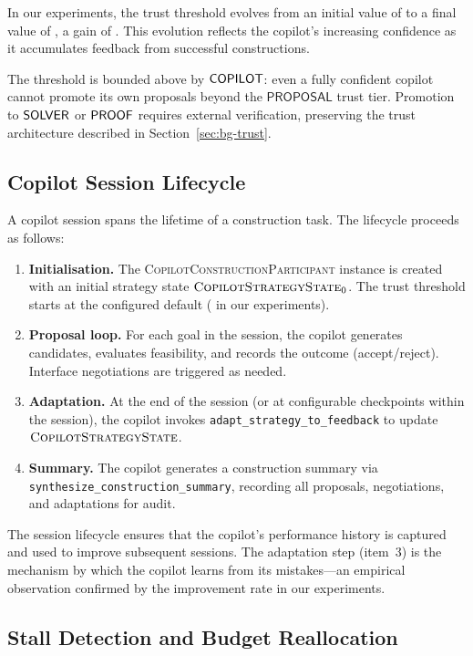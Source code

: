 \documentclass[11pt]{article}
\newcommand{\CCP}{\textsc{CopilotConstructionParticipant}}
\newcommand{\CSS}{\textsc{CopilotStrategyState}}
\begin{document}
In our experiments, the trust threshold evolves from an initial
value of \ppLXXXVIinitTrust{} to a final value of
\ppLXXXVIfinalTrust{}, a gain of \ppLXXXVItrustGain{}.  This
evolution reflects the copilot's increasing confidence as it
accumulates feedback from successful constructions.

The threshold is bounded above by $\mathsf{COPILOT}$: even a fully
confident copilot cannot promote its own proposals beyond the
$\mathsf{PROPOSAL}$ trust tier.  Promotion to $\mathsf{SOLVER}$ or
$\mathsf{PROOF}$ requires external verification, preserving the trust
architecture described in Section~\ref{sec:bg-trust}.

\subsection{Copilot Session Lifecycle}\label{sec:neg-lifecycle}

A copilot session spans the lifetime of a construction task.  The
lifecycle proceeds as follows:
\begin{enumerate}
  \item \textbf{Initialisation.}  The \CCP{} instance is created
        with an initial strategy state $\CSS_0$.  The trust threshold
        starts at the configured default (\ppLXXXVIinitTrust{} in our
        experiments).
  \item \textbf{Proposal loop.}  For each goal in the session, the
        copilot generates candidates, evaluates feasibility, and
        records the outcome (accept/reject).  Interface negotiations
        are triggered as needed.
  \item \textbf{Adaptation.}  At the end of the session (or at
        configurable checkpoints within the session), the copilot
        invokes \texttt{adapt\_strategy\_to\_feedback} to update
        $\CSS$.
  \item \textbf{Summary.}  The copilot generates a construction
        summary via \texttt{synthesize\_construction\_summary},
        recording all proposals, negotiations, and adaptations for
        audit.
\end{enumerate}

The session lifecycle ensures that the copilot's performance history
is captured and used to improve subsequent sessions.  The
adaptation step (item~3) is the mechanism by which the copilot
learns from its mistakes---an empirical observation confirmed by the
\ppLXXXVIadaptImproveRate{} improvement rate in our experiments.

\subsection{Stall Detection and Budget
            Reallocation}\label{sec:neg-stall}
\end{document}

